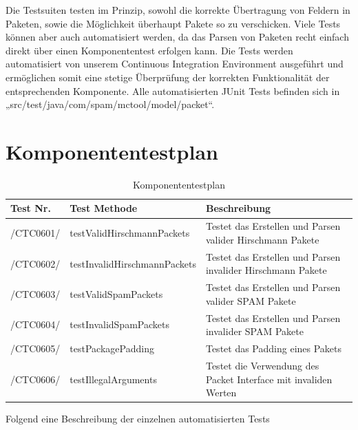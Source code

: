 Die Testsuiten testen im Prinzip, sowohl die korrekte Übertragung von Feldern in Paketen, sowie die
Möglichkeit überhaupt Pakete so zu verschicken.
Viele Tests können aber auch automatisiert werden, da das Parsen von Paketen 
recht einfach direkt über einen Komponententest erfolgen kann.
Die Tests werden automatisiert von unserem Continuous Integration Environment ausgeführt und ermöglichen somit eine stetige Überprüfung der korrekten Funktionalität der entsprechenden
Komponente. Alle automatisierten JUnit Tests befinden
sich in „src/test/java/com/spam/mctool/model/packet“. 

\newpage

\section{Komponententestplan}

\begin{table}[h]
\caption{Komponententestplan}
\label{tab:ktp}
\begin{center}
\begin{tabular}{|p{2cm}|p{6cm}|p{6cm}|}
\hline
\textbf{Test Nr.} & \textbf{Test Methode} & \textbf{Beschreibung}\\
\hline
/CTC0601/ & testValidHirschmannPackets & Testet das Erstellen und Parsen valider Hirschmann Pakete\\
\hline
/CTC0602/ & testInvalidHirschmannPackets & Testet das Erstellen und Parsen invalider Hirschmann Pakete\\
\hline
/CTC0603/ & testValidSpamPackets & Testet das Erstellen und Parsen valider SPAM Pakete\\
\hline
/CTC0604/ & testInvalidSpamPackets & Testet das Erstellen und Parsen invalider SPAM Pakete\\
\hline
/CTC0605/ & testPackagePadding & Testet das Padding eines Pakets\\
\hline
/CTC0606/ & testIllegalArguments & Testet die Verwendung des Packet Interface mit invaliden Werten\\
\hline
\end{tabular}
\end{center}
\end{table}

Folgend eine Beschreibung der einzelnen automatisierten Tests

